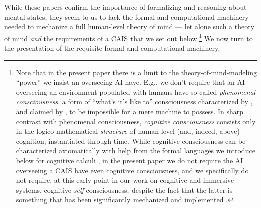 While these papers confirm the importance of formalizing and reasoning
about mental states, they seem to us to lack the formal and
computational machinery needed to mechanize a full human-level theory
of mind --- let alone such a theory of mind \emph{and} the
requirements of a CAIS that we set out below.\footnote{Note that in
  the present paper there is a limit to the theory-of-mind-modeling
  ``power'' we insist an overseeing AI have.  E.g., we don't require
  that an AI overseeing an environment populated with humans have
  so-called \textit{phenomenal consciousness}, a form of ``what's it's
  like to'' consciousness characterized by \cite{bbs.block}, and
  claimed by \cite{sb_billion_conscious_robot}, to be impossible for a
  mere machine to possess.  In sharp contrast with phenomenal
  consciousness, \textit{cognitive consciousness} consists only in the
  logico-mathematical \emph{structure} of human-level (and, indeed,
  above) cognition, instantiated through time.  While cognitive
  consciousness can be characterized axiomatically with help from the
  formal languages we introduce below for cognitive calculi
  \citep{axiomatizing_consciousness1}, in the present paper we do not
  require the AI overseeing a CAIS have even cognitive consciousness,
  and we specifically do not require, at this early point in our work
  on cognitive-and-immersive systems, cognitive
  \emph{self}-consciousness, despite the fact that the latter is
  something that has been significantly mechanized and implemented
  \cite{roman2015_robot_self-con,sb_on_knowledge_game}.}  We now turn
to the presentation of the requisite formal and computational
machinery.
